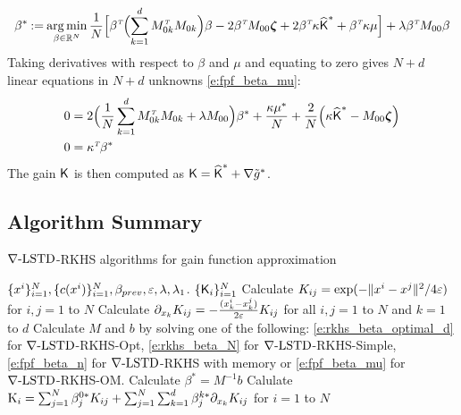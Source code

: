 \begin{equation}
\beta ^* \mathbin{:=}
\mathop{\rm arg{\,}min}_{\beta  \in \mathbb{R}^N} \frac{1}{N} \Bigl[  \beta ^{\hbox{\tiny\it T}} \Bigl( \sum_{k=1}^d M_{0k}^{\hbox{\tiny\it T}} M_{0k} \Bigr) \beta   - 2 \beta ^{\hbox{\tiny\it T}}  M_{00} \boldsymbol{\zeta} + 2 \beta ^{\hbox{\tiny\it T}} \kappa \widehat{\text{\sf K}}^* + \beta ^{\hbox{\tiny\it T}} \kappa \mu  \Bigr]+ \lambda \beta ^{\hbox{\tiny\it T}}  M_{00} \beta
\end{equation}
Taking derivatives with respect to $\beta $ and $\mu $ and equating to zero gives $N+d$ linear equations in $N+d$ unknowns \eqref{e:fpf_beta_mu}:
\begin{equation}
\begin{aligned}
0  &=  2 \Bigl(  \frac{1}{N}  \sum_{k=1}^d M_{0k}^\transpose M_{0k}   +  \lambda M_{00} \Bigr) \beta ^* + \frac{ \kappa \mu ^*}{N}+  \frac{2}{N} \Bigl( \kappa \hakFPF^*  -   M_{00} \boldsymbol{\zeta} \Bigr)  \\
0  & = \kappa^{\transpose} \beta^*
\label{e:fpf_beta_mu}
\end{aligned}
\end{equation}
The gain $\text{\sf K}$ is then computed as
$
\text{\sf K} = \widehat{\text{\sf K}}^* + \nabla \tilde g^*$.

\subsection{Algorithm Summary}
\label{alg:rkhs}
\begin{algorithm}{$\nabla\text{-LSTD}$-RKHS algorithms for gain function approximation}
	\begin{algorithmic}[1]
		\Require $\{x^i\}_{i=1}^N, \{c(x^i)\}_{i=1}^N, \beta_{prev}, \varepsilon, \lambda, \lambda_1$.
		\Ensure $\{\text{\sf K}_i\}_{i=1}^N$
		\State Calculate $K_{ij} = \exp(-\|x^i - x^j\|^2/ 4\varepsilon)$ for $i,j = 1$ to $N$  
		\State Calculate $ \partial_{x_k}K_{ij} = -\frac{(x_k^i - x_k^j)}{2\varepsilon} K_{ij}$ for all $i,j =1$ to $N$ and $k = 1$ to $d$ 
		\State Calculate $M$ and $b$ by solving one of the following: \eqref{e:rkhs_beta_optimal_d} for $\nabla\text{-LSTD}$-RKHS-Opt, \eqref{e:rkhs_beta_N} for $\nabla\text{-LSTD}$-RKHS-Simple, \eqref{e:fpf_beta_n} for $\nabla\text{-LSTD}$-RKHS with memory or \eqref{e:fpf_beta_mu} for $\nabla\text{-LSTD}$-RKHS-OM.  
		\State Calculate $\beta^* = M^{-1}b$
		\State Calulate $\text{K}_i  =  \sum_{j=1}^N  \beta^{0*}_j K_{ij} + \sum_{j=1}^N \sum_{k=1}^d \beta^{k*}_j \partial_{x_k} K_{ij}$ for $i =1$ to $N$ 
	\end{algorithmic}
\end{algorithm} 

